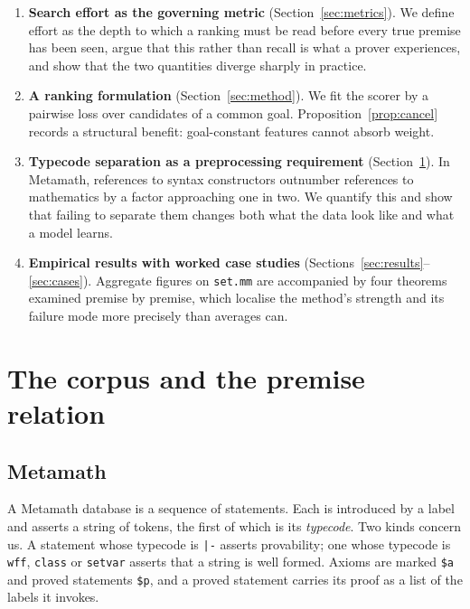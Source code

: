 \documentclass[11pt]{article}
\theoremstyle{plain}
\theoremstyle{definition}
\theoremstyle{remark}
\begin{document}
\begin{enumerate}[leftmargin=1.5em,itemsep=3pt]
\item \textbf{Search effort as the governing metric}
(Section~\ref{sec:metrics}). We define effort as the depth to which a ranking
must be read before every true premise has been seen, argue that this rather
than recall is what a prover experiences, and show that the two quantities
diverge sharply in practice.

\item \textbf{A ranking formulation} (Section~\ref{sec:method}). We fit the
scorer by a pairwise loss over candidates of a common goal.
Proposition~\ref{prop:cancel} records a structural benefit: goal-constant
features cannot absorb weight.

\item \textbf{Typecode separation as a preprocessing requirement}
(Section~\ref{sec:corpus}). In Metamath, references to syntax constructors
outnumber references to mathematics by a factor approaching one in two. We
quantify this and show that failing to separate them changes both what the data
look like and what a model learns.

\item \textbf{Empirical results with worked case studies}
(Sections~\ref{sec:results}--\ref{sec:cases}). Aggregate figures on
\texttt{set.mm} are accompanied by four theorems examined premise by premise,
which localise the method's strength and its failure mode more precisely than
averages can.
\end{enumerate}

\section{The corpus and the premise relation}\label{sec:corpus}

\subsection{Metamath}

A Metamath database is a sequence of statements. Each is introduced by a label
and asserts a string of tokens, the first of which is its \emph{typecode}. Two
kinds concern us. A statement whose typecode is \verb!|-! asserts provability; one
whose typecode is \texttt{wff}, \texttt{class} or \texttt{setvar} asserts that a
string is well formed. Axioms are marked \texttt{\$a} and proved statements
\texttt{\$p}, and a proved statement carries its proof as a list of the labels it
invokes.
\end{document}
